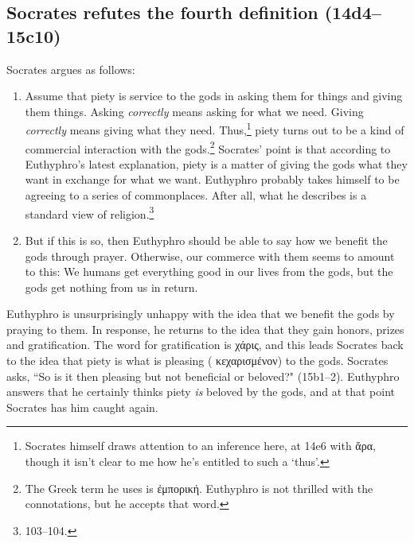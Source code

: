 \documentclass[12pt]{article}
\begin{document}

\subsection{Socrates refutes the fourth definition (14d4--15c10)}

Socrates argues as follows:

\begin{enumerate}

    \item Assume that piety is service to the gods in asking them for things
        and giving them things.  Asking \emph{correctly} means asking for what
        we need.  Giving \emph{correctly} means giving what they need.
        Thus,\footnote{Socrates himself draws attention to an inference here,
        at 14e6 with {\g ἄρα}, though it isn't clear to me how he's entitled to
        such a `thus'.} piety turns out to be a kind of commercial interaction
        with the gods.\footnote{The Greek term he uses is {\g ἐμπορική}.
        Euthyphro is not thrilled with the connotations, but he accepts that
        word.}  Socrates' point is that according to Euthyphro's latest
        explanation, piety is a matter of giving the gods what they want in
        exchange for what we want.  Euthyphro probably takes himself to be
        agreeing to a series of commonplaces.  After all, what he describes is
        a standard  view of
        religion.\footnote{\citet{bailly2003} 103--104.}

    \item But if this is so, then Euthyphro should be able to say how we
        benefit the gods through prayer.  Otherwise, our commerce with them
        seems to amount to this: We humans get everything good in our lives
        from the gods, but the gods get nothing from us in return.

\end{enumerate}

Euthyphro is unsurprisingly unhappy with the idea that we benefit the gods by
praying to them. In response, he returns to the idea that they gain honors,
prizes and gratification.  The word for gratification is {\g χάρις}, and this
leads Socrates back to the idea that piety is what is pleasing ({\g
κεχαρισμένον}) to the gods.  Socrates asks, ``So is it then pleasing but not
beneficial or beloved?" (15b1--2).  Euthyphro answers that he certainly thinks
piety \emph{is} beloved by the gods, and at that point Socrates has him caught
again.
\end{document}
